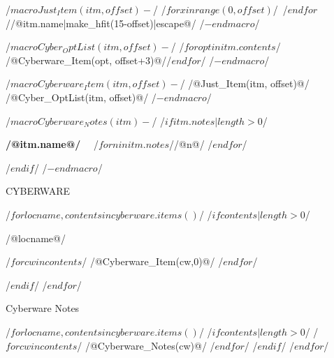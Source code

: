 /$ macro Just_Item(itm, offset) -$/       
/$for x in range(0,offset)$/\ /$endfor$//@itm.name|make_hfit(15-offset)|escape@/\hfill
/$- endmacro $/

/$ macro Cyber_OptList(itm, offset) -$/
/$for opt in itm.contents$/
/@Cyberware_Item(opt, offset+3)@//$endfor$/
/$- endmacro $/

/$ macro Cyberware_Item(itm, offset) -$/
/@Just_Item(itm, offset)@/\\/@Cyber_OptList(itm, offset)@/
/$- endmacro $/

/$ macro Cyberware_Notes(itm) -$/
/$if itm.notes|length>0$/
\begin{minipage}{\columnwidth}
\noindent\textbf{ /@itm.name@/ }\ \  /$for n in itm.notes$//@n@/ /$endfor$/
\end{minipage}
/$endif$/
/$- endmacro $/

\centerline{\large CYBERWARE}
\renewcommand{\columnseprulecolor}{\color{white}}
\begin{multicols*}{2}
\RaggedRight
/$ for locname, contents in cyberware.items() $/
/$ if contents|length > 0 $/ 
\begin{minipage}{\columnwidth}
\centerline{\textcolor{chrome}{ /@locname@/ }}
/$ for cw in contents $/
/@Cyberware_Item(cw,0)@/
/$ endfor $/
\end{minipage}
/$ endif $/
/$ endfor $/
\justifying
\vfill\null
\end{multicols*}
\renewcommand{\columnseprulecolor}{\color{cyberred}}

\centerline{ Cyberware Notes}
/$ for locname, contents in cyberware.items() $/
/$ if contents|length > 0 $/ 
/$ for cw in contents $/
/@Cyberware_Notes(cw)@/
/$ endfor $/
/$ endif $/
/$ endfor $/
